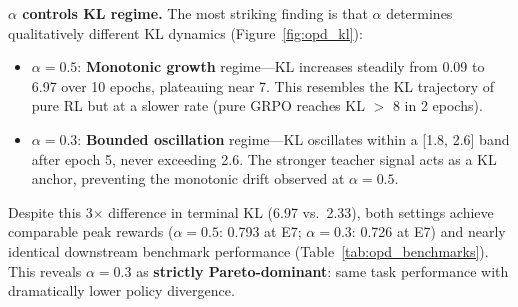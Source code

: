 \documentclass{article}
\begin{document}
\textbf{$\alpha$ controls KL regime.} The most striking finding is that $\alpha$ determines qualitatively different KL dynamics (Figure~\ref{fig:opd_kl}):
\begin{itemize}[nosep, leftmargin=*]
    \item $\alpha=0.5$: \textbf{Monotonic growth} regime---KL increases steadily from 0.09 to 6.97 over 10 epochs, plateauing near 7. This resembles the KL trajectory of pure RL but at a slower rate (pure GRPO reaches KL $>$ 8 in 2 epochs).
    \item $\alpha=0.3$: \textbf{Bounded oscillation} regime---KL oscillates within a [1.8, 2.6] band after epoch 5, never exceeding 2.6. The stronger teacher signal acts as a KL anchor, preventing the monotonic drift observed at $\alpha=0.5$.
\end{itemize}

Despite this 3$\times$ difference in terminal KL (6.97 vs.\ 2.33), both settings achieve comparable peak rewards ($\alpha=0.5$: 0.793 at E7; $\alpha=0.3$: 0.726 at E7) and nearly identical downstream benchmark performance (Table~\ref{tab:opd_benchmarks}). This reveals $\alpha=0.3$ as \textbf{strictly Pareto-dominant}: same task performance with dramatically lower policy divergence.

\begin{table}[t]
\centering
\caption{OPD benchmark comparison (best checkpoints, epoch 7). SFT Base: original SFT-only checkpoint. RL Base: Dr.~GRPO step 950 (OPD starting point). OPD models trained as LoRA adapters on RL Base with SFT teacher.}
\label{tab:opd_benchmarks}
\end{table}
\end{document}
